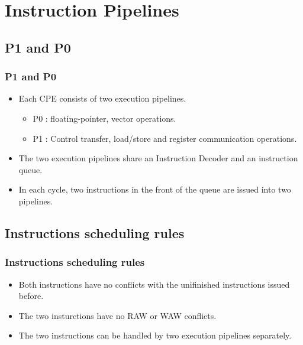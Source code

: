 \section{Instruction Pipelines}

\subsection{P1 and P0}
\begin{frame}
    \frametitle{P1 and P0}
	\begin{itemize}
		\item Each CPE consists of two execution pipelines.
		\begin{itemize}
			\item P0 : floating-pointer, vector operations. 
			\item P1 : Control transfer, load/store and register communication operations.
		\end{itemize}
		\item The two execution pipelines share an Instruction Decoder and an instruction queue.
		\item In each cycle, two instructions in the front of the queue are issued into two pipelines.
	\end{itemize} 
\end{frame}
\subsection{Instructions scheduling rules}
\begin{frame}
	\frametitle{Instructions scheduling rules}
	\begin{itemize}
		\item Both instructions have no conflicts with the unifinished instructions issued before. 
		\item The two insturctions have no RAW or WAW conflicts.
		\item The two instructions can be handled by two execution pipelines separately.  
	\end{itemize}
\end{frame}



	


